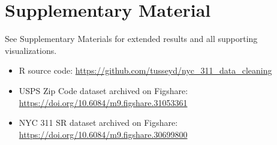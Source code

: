 \documentclass[linenumber]{jdsart}
\begin{document}

\section*{Supplementary Material}
See Supplementary Materials for extended results and all supporting visualizations.

\begin{itemize}[leftmargin=*, nosep]
  \item \textsc{R} source code: \url{https://github.com/tusseyd/nyc_311_data_cleaning}
  \item USPS Zip Code dataset archived on Figshare: \url{https://doi.org/10.6084/m9.figshare.31053361}
  \item NYC 311 SR dataset archived on Figshare: \url{https://doi.org/10.6084/m9.figshare.30699800}
\end{itemize}




\end{document}
